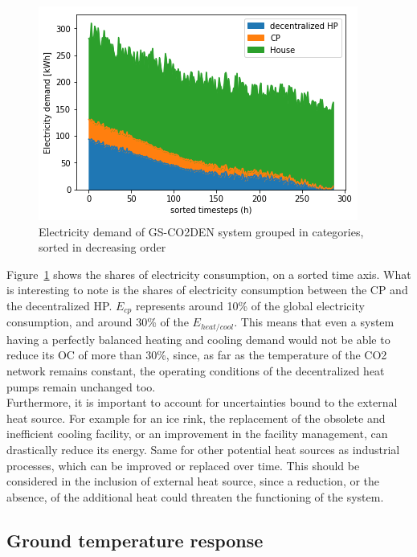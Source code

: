 \documentclass{article}
\begin{document}
\begin{figure}[tph]
	\centering
	\includegraphics[width=0.5\linewidth]{Images/V_CO2_eldem_sorted}
	\caption{Electricity demand of GS-CO2DEN system grouped in categories, sorted in decreasing order}
	\label{fig:gsco2_el}
\end{figure}

Figure~\ref{fig:gsco2_el} shows the shares of electricity consumption, on a sorted time axis. What is interesting to note is the shares of electricity consumption between the CP and the decentralized HP. $E_{cp}$ represents around 10\% of the global electricity consumption, and around 30\% of the $E_{heat/cool}$. This means that even a system having a perfectly balanced heating and cooling demand would not be able to reduce its OC of more than 30\%, since, as far as the temperature of the CO2 network remains constant, the operating conditions of the decentralized heat pumps remain unchanged too.\\

Furthermore, it is important to account for uncertainties bound to the external heat source. For example for an ice rink, the replacement of the obsolete and inefficient cooling facility, or an improvement in the facility management, can drastically reduce its energy. Same for other potential heat sources as industrial processes, which can be improved or replaced over time. This should be considered in the inclusion of external heat source, since a reduction, or the absence, of the additional heat could threaten the functioning of the system.


\subsection{Ground temperature response}\label{ss:Tg}

\end{document}
